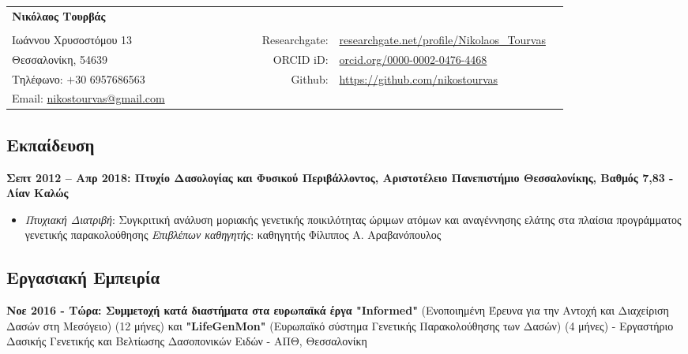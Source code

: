 \documentclass[12pt,]{scrartcl}
\date{}
\begin{document}
\begin{table}[h]
{\def\arraystretch{1.0}\tabcolsep=0pt
\begin{tabular}{p{0.42\linewidth}p{0.05\linewidth}p{0.35\linewidth}}

  \multirow{1}{*}{\LARGE \textbf{Νικόλαος Τουρβάς}} &  &  \\
  
  & & \\
  
  Ιωάννου Χρυσοστόμου 13 & \multicolumn{1}{r}{Researchgate:\;\;} & \multicolumn{1}{l}{\url{researchgate.net/profile/Nikolaos_Tourvas}} \\
  
  Θεσσαλονίκη, 54639 & \multicolumn{1}{r}{ORCID iD:\;\;} & \multicolumn{1}{l}{\href{https://orcid.org/0000-0002-0476-4468}{orcid.org/0000-0002-0476-4468}} \\
  
  Τηλέφωνο: $+$30 6957686563 & \multicolumn{1}{r}{Github:\;\;} & \multicolumn{1}{l}{\href{https://github.com/nikostourvas}{https://github.com/nikostourvas}} \\
  
  Email: {\href{nikostourvas@gmail.com}{nikostourvas@gmail.com}} 
\end{tabular}%
}
\end{table}


\subsection{Εκπαίδευση}\label{Εκπαίδευση}
\vspace{-3mm}
\textbf{Σεπτ 2012 -- Απρ 2018: Πτυχίο Δασολογίας και Φυσικού Περιβάλλοντος, Αριστοτέλειο Πανεπιστήμιο Θεσσαλονίκης, Βαθμός 7,83 - Λίαν Καλώς}
\begin{itemize}
\setlength\itemsep{-0.5em}
\item \textit{Πτυχιακή Διατριβή}: Συγκριτική ανάλυση μοριακής γενετικής ποικιλότητας
ώριμων ατόμων και αναγέννησης ελάτης στα πλαίσια
προγράμματος γενετικής παρακολούθησης
\vspace{2mm}
\newline
\textit{Επιβλέπων καθηγητής}: καθηγητής Φίλιππος Α. Αραβανόπουλος
\end{itemize}

\vspace{-3mm}

\subsection{Εργασιακή Εμπειρία}\label{Εμπειρία}
\vspace{-3mm}
\textbf{Νοε 2016 - Τώρα: Συμμετοχή κατά διαστήματα στα ευρωπαϊκά έργα "Informed"} (Ενοποιημένη Έρευνα για την Αντοχή και Διαχείριση Δασών στη Μεσόγειο) (12 μήνες) και \textbf{"LifeGenMon"} (Ευρωπαϊκό σύστημα Γενετικής Παρακολούθησης των Δασών) (4 μήνες) - Εργαστήριο Δασικής Γενετικής και Βελτίωσης Δασοπονικών Ειδών - ΑΠΘ, Θεσσαλονίκη 
\end{document}
